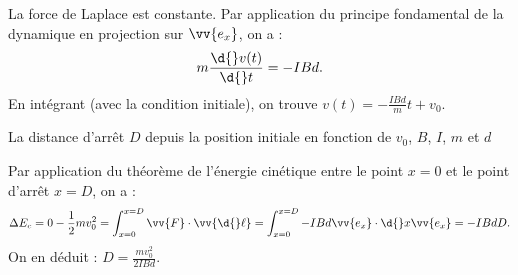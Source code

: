
\begin{corrige}
La force de Laplace est constante. Par application du principe fondamental de la dynamique en projection sur $\vv{e_x}$, on a :
\[
m\frac{\d{}v(t)}{\d{}t}=-IBd.
\]
En intégrant (avec la condition initiale), on trouve $v(t)=-\frac{IBd}{m}t+v_0$.
\end{corrige}

\begin{enonce}
La distance d'arrêt $D$ depuis la position initiale en fonction de $v_0$, $B$, $I$, $m$ et $d$
\end{enonce}


\begin{corrige}
Par application du théorème de l'énergie cinétique entre le point $x=0$ et le point d'arrêt $x=D$, on a :
\[
\Delta E_c=0-\frac{1}{2}mv_0^2=\int_{x=0}^{x=D}\vv{F}\cdot\vv{\d{}\ell}=\int_{x=0}^{x=D}-IBd\vv{e_x}\cdot\d{}x\vv{e_x}=-IBdD.
\]
On en déduit : $D=\frac{mv_0^2}{2IBd}$.
\end{corrige}

\finEntrainement









\hauteurLargeurCadreReponse		{10mm}{5cm}
\typeEntrainement				{} %
\initialisationEntrainement

                                \initialisationPartieGauche %
%            

